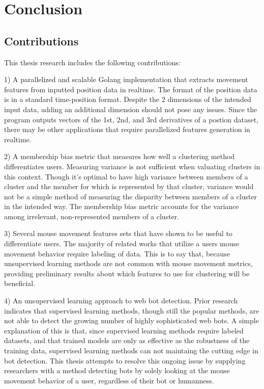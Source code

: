
\chapter{Conclusion}\label{ch:conclustion}

\section{Contributions}\label{sec:contributions}
This thesis research includes the following contributions:

1) A parallelized and scalable Golang implementation that extracts movement features from inputted position data in realtime.
The format of the position data is in a standard time-position format.
Despite the 2 dimensions of the intended input data, adding an additional dimension should not pose any issues.
Since the program outputs vectors of the 1st, 2nd, and 3rd derivatives of a postion dataset, there may be other applications that require parallelized features generation in realtime.

2) A membership bias metric that measures how well a clustering method differentiates users.
Measuring variance is not sufficient when valuating clusters in this context.
Though it's optimal to have high variance between members of a cluster and the member for which is represented by that cluster, variance would not be a simple method of measuring the disparity between members of a cluster in the intended way.
The membership bias metric accounts for the variance among irrelevant, non-represented members of a cluster.

3) Several mouse movement features sets that have shown to be useful to differentiate users.
The majority of related works that utilize a users mouse movement behavior require labeling of data.
This is to say that, because unsupervised learning methods are not common with mouse movement metrics, providing preliminary results about which features to use for clustering will be beneficial.

4) An unsupervised learning approach to web bot detection.
Prior research indicates that supervised learning methods, though still the popular methods, are not able to detect the growing number of highly sophisticated web bots.
A simple explanation of this is that, since supervised learning methods require labeled datasets, and that trained models are only as effective as the robustness of the training data, supervised learning methods can not maintaing the cutting edge in bot detection.
This thesis attempts to resolve this ongoing issue by supplying researchers with a method detecting bots by solely looking at the mouse movement behavior of a user, regardless of their bot or humanness.

